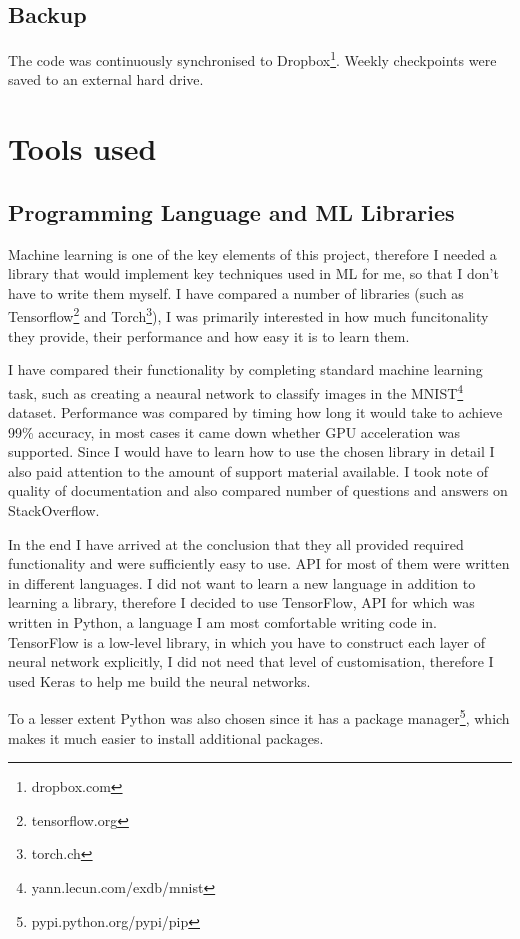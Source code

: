 \documentclass[12pt,a4paper]{book}
\begin{document}
\subsection{Backup}
The code was continuously synchronised to Dropbox\footnote{dropbox.com}.
Weekly checkpoints were saved to an external hard drive.
\section{Tools used}
\subsection{Programming Language and ML Libraries}
Machine learning is one of the key elements of this project, therefore I needed a library that would implement key techniques used in ML for me, so that I don't have to write them myself.
I have compared a number of libraries (such as Tensorflow\footnote{tensorflow.org} and Torch\footnote{torch.ch}), I was primarily interested in how much funcitonality they provide, their performance and how easy it is to learn them.

I have compared their functionality by completing standard machine learning task, such as creating a neaural network to classify images in the MNIST\footnote{yann.lecun.com/exdb/mnist} dataset.
Performance was compared by timing how long it would take to achieve 99\% accuracy, in most cases it came down whether GPU acceleration was supported.
Since I would have to learn how to use the chosen library in detail I also paid attention to the amount of support material available.
I took note of quality of documentation and also compared number of questions and answers on StackOverflow.

In the end I have arrived at the conclusion that they all provided required functionality and were sufficiently easy to use.
API for most of them were written in different languages.
I did not want to learn a new language in addition to learning a library, therefore I decided to use TensorFlow, API for which was written in Python, a language I am most comfortable writing code in.
TensorFlow is a low-level library, in which you have to construct each layer of neural network explicitly, I did not need that level of customisation, therefore I used Keras to help me build the neural networks.

To a lesser extent Python was also chosen since it has a package manager\footnote{pypi.python.org/pypi/pip}, which makes it much easier to install additional packages.
\end{document}
